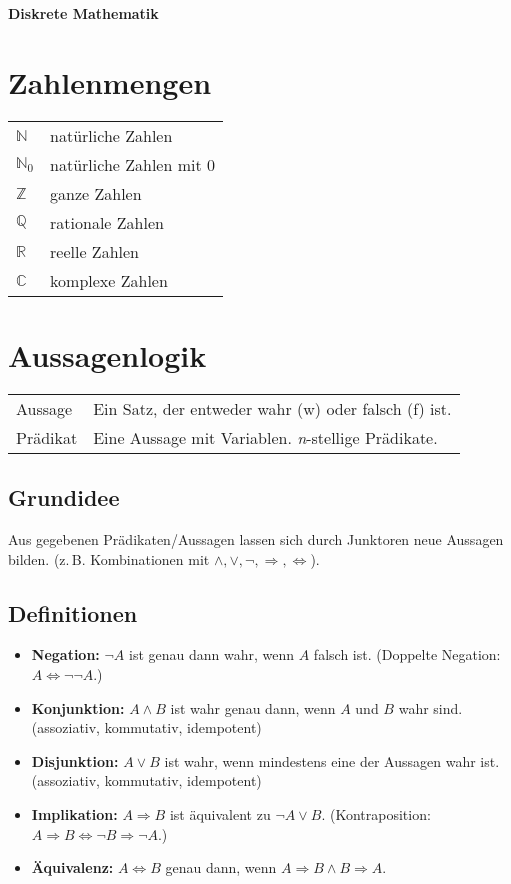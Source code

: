 \documentclass[10pt,landscape]{article}
\begin{document}

\begin{multicols*}{4}

\begin{center}
     \Large{\textbf{Diskrete Mathematik}} \\
\end{center}

\section{Zahlenmengen}
\begin{tabular}{@{}ll@{}}
\(\mathbb{N}\) & natürliche Zahlen \\
\(\mathbb{N}_0\) & natürliche Zahlen mit 0 \\
\(\mathbb{Z}\) & ganze Zahlen \\
\(\mathbb{Q}\) & rationale Zahlen \\
\(\mathbb{R}\) & reelle Zahlen \\
\(\mathbb{C}\) & komplexe Zahlen \\
\end{tabular}

\section{Aussagenlogik}
\begin{tabular}{@{} p{1.2cm}|p{4.5cm}| @{}}
Aussage & Ein Satz, der entweder wahr (w) oder falsch (f) ist. \\
Prädikat & Eine Aussage mit Variablen. {\it n}-stellige Prädikate. \\
\end{tabular}

\subsection{Grundidee}
Aus gegebenen Prädikaten/Aussagen lassen sich durch Junktoren neue Aussagen bilden. (z.\,B. Kombinationen mit \(\land,\lor,\lnot,\Rightarrow,\Leftrightarrow\)).

\subsection{Definitionen}
\begin{itemize}
  \item \textbf{Negation:} \(\lnot A\) ist genau dann wahr, wenn \(A\) falsch ist. (Doppelte Negation: \(A\Leftrightarrow\lnot\lnot A\).)
  \item \textbf{Konjunktion:} \(A\land B\) ist wahr genau dann, wenn \(A\) und \(B\) wahr sind. (assoziativ, kommutativ, idempotent)
  \item \textbf{Disjunktion:} \(A\lor B\) ist wahr, wenn mindestens eine der Aussagen wahr ist. (assoziativ, kommutativ, idempotent)
  \item \textbf{Implikation:} \(A\Rightarrow B\) ist äquivalent zu \(\lnot A\lor B\). (Kontraposition: \(A\Rightarrow B \Leftrightarrow \lnot B\Rightarrow\lnot A\).)
  \item \textbf{Äquivalenz:} \(A\Leftrightarrow B\) genau dann, wenn \(A\Rightarrow B \land B\Rightarrow A\).
\end{itemize}


\end{multicols*}
\end{document}
